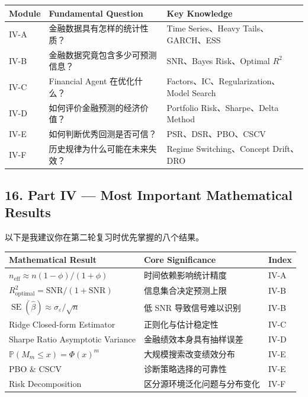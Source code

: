 \begin{readertable}
\begin{longtable}[]{@{}
  >{\raggedright\arraybackslash}p{}
  >{\raggedright\arraybackslash}p{}
  >{\raggedright\arraybackslash}p{}@{}}
\toprule
Module & Fundamental Question & Key Knowledge \\
\midrule
\endhead
IV-A & 金融数据具有怎样的统计性质？ & Time Series、Heavy Tails、GARCH、ESS \\
IV-B & 金融数据究竟包含多少可预测信息？ & SNR、Bayes Risk、Optimal \(R^2\) \\
IV-C & Financial Agent 在优化什么？ & Factors、IC、Regularization、Model Search \\
IV-D & 如何评价金融预测的经济价值？ & Portfolio Risk、Sharpe、Delta Method \\
IV-E & 如何判断优秀回测是否可信？ & PSR、DSR、PBO、CSCV \\
IV-F & 历史规律为什么可能在未来失效？ & Regime Switching、Concept Drift、DRO \\
\bottomrule
\end{longtable}
\end{readertable}

\hypertarget{part-4-77-0001-part-iv-most-important-mathematical-results}{%
\subsection{16. Part IV --- Most Important Mathematical Results}\label{part-4-77-0001-part-iv-most-important-mathematical-results}}

以下是我建议你在第二轮复习时优先掌握的八个结果。

\begin{readertable}
\begin{longtable}[]{@{}
  >{\raggedright\arraybackslash}p{}
  >{\raggedright\arraybackslash}p{}
  >{\raggedright\arraybackslash}p{}@{}}
\toprule
Mathematical Result & Core Significance & Index \\
\midrule
\endhead
\(n_{\mathrm{eff}}\approx n(1-\phi)/(1+\phi)\) & 时间依赖影响统计精度 & IV-A \\
\(R_{\mathrm{optimal}}^2=\mathrm{SNR}/(1+\mathrm{SNR})\) & 信息集合决定预测上限 & IV-B \\
\(\operatorname{SE}(\hat\beta)\approx\sigma_\varepsilon/\sqrt n\) & 低 SNR 导致信号难以识别 & IV-B \\
Ridge Closed-form Estimator & 正则化与估计稳定性 & IV-C \\
Sharpe Ratio Asymptotic Variance & 金融绩效本身具有抽样误差 & IV-D \\
\(\mathbb P(M_m\leq x)=\Phi(x)^m\) & 大规模搜索改变绩效分布 & IV-E \\
PBO \& CSCV & 诊断策略选择的可靠性 & IV-E \\
Risk Decomposition & 区分源环境泛化问题与分布变化 & IV-F \\
\bottomrule
\end{longtable}
\end{readertable}

